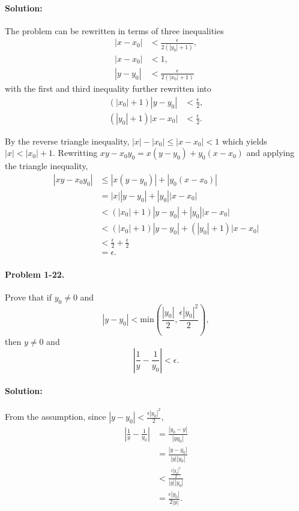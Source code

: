 \documentclass{article}
\begin{document}
\paragraph{Solution:} The problem can be rewritten in terms of three
inequalities \begin{align*}
  |x - x_0| &< \frac{\epsilon}{2(|y_0| + 1)}, \\
  |x - x_0| &< 1, \\
  |y - y_0| &< \frac{\epsilon}{2(|x_0| + 1)}
\end{align*} with the first and third inequality further rewritten into
\begin{align*}
  (|x_0| + 1)|y - y_0| &< \frac{\epsilon}{2}, \\
  (|y_0| + 1)|x - x_0| &< \frac{\epsilon}{2}.
\end{align*}

By the reverse triangle inequality, $|x| - |x_0| \leq |x - x_0| < 1$ which
yields $|x| < |x_0| + 1$. Rewritting $xy - x_0y_0 = x(y - y_0) + y_0(x - x_0)$
and applying the triangle inequality, \begin{align*}
  |xy - x_0y_0| &\leq |x(y - y_0)| + |y_0(x - x_0)| \\
    &= |x||y - y_0| + |y_0||x - x_0| \\
    &< (|x_0| + 1)|y - y_0| + |y_0||x - x_0| \\
    &< (|x_0| + 1)|y - y_0| + (|y_0| + 1)|x - x_0| \\
    &< \frac{\epsilon}{2} + \frac{\epsilon}{2} \\
    &= \epsilon.
\end{align*}

\paragraph{Problem 1-22.} Prove that if $y_0 \neq 0$ and \begin{equation*}
  |y - y_0| < \mathrm{min}\left(\frac{|y_0|}{2}, \frac{\epsilon|y_0|^2}{2}
    \right),
\end{equation*} then $y \neq 0$ and \begin{equation*}
  \left|\frac{1}{y} - \frac{1}{y_0}\right| < \epsilon.
\end{equation*}

\paragraph{Solution:} From the assumption, since $|y - y_0| <
\frac{\epsilon|y_0|^2}{2}$, \begin{align*}
  \left|\frac{1}{y} - \frac{1}{y_0}\right| &= \frac{|y_0 - y|}{|yy_0|} \\
    &= \frac{|y - y_0|}{|y||y_0|} \\
    &< \frac{\frac{\epsilon|y_0|^2}{2}}{|y||y_0|} \\
    &= \frac{\epsilon|y_0|}{2|y|}.
\end{align*}
\end{document}
